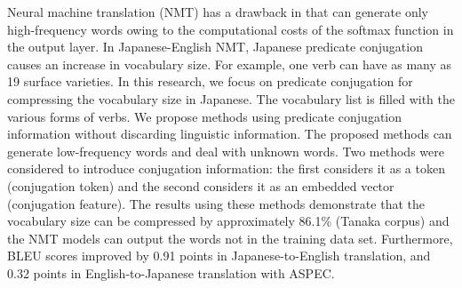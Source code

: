 Neural machine translation (NMT) has a drawback in that can generate only high-frequency words owing to the computational costs of the softmax function in the output layer. In Japanese-English NMT, Japanese predicate conjugation causes an increase in vocabulary size. For example, one verb can have as many as 19 surface varieties. In this research, we focus on predicate conjugation for compressing the vocabulary size in Japanese. The vocabulary list is filled with the various forms of verbs. We propose methods using predicate conjugation information without discarding linguistic information. The proposed methods can generate low-frequency words and deal with unknown words. Two methods were considered to introduce conjugation information: the first considers it as a token (conjugation token) and the second considers it as an embedded vector (conjugation feature). The results using these methods demonstrate that the vocabulary size can be compressed by approximately 86.1\% (Tanaka corpus) and the NMT models can output the words not in the training data set. Furthermore, BLEU scores improved by 0.91 points in Japanese-to-English translation, and 0.32 points in English-to-Japanese translation with ASPEC.

